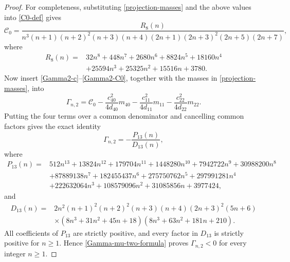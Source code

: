 \documentclass[11pt]{article}
\begin{document}
\begin{proof}
For completeness, substituting \eqref{projection-masses} and the above values into \eqref{C0-def} gives
\begin{equation}\label{Gamma2-C0}
 \mathscr C_0=
 \frac{R_8(n)}
 {n^3(n+1)(n+2)^2(n+3)(n+4)(2n+1)(2n+3)^2(2n+5)(2n+7)},
\end{equation}
where
\begin{align*}
 R_8(n)={}&32n^8+448n^7+2680n^6+8824n^5+18160n^4\\
 &+25594n^3+25325n^2+15516n+3780.
\end{align*}
Now insert \eqref{Gamma2-c}--\eqref{Gamma2-C0}, together with the masses in \eqref{projection-masses}, into
\[
 \Gamma_{n,2}=\mathscr C_0-
 \frac{c_{40}^2}{4d_{40}}m_{40}
 -\frac{c_{11}^2}{4d_{11}}m_{11}
 -\frac{c_{22}^2}{4d_{22}}m_{22}.
\]
Putting the four terms over a common denominator and cancelling common factors gives the exact identity
\begin{equation}\label{Gamma-mu-two-formula}
 \Gamma_{n,2}=-\frac{P_{13}(n)}{D_{13}(n)},
\end{equation}
where
\begin{align*}
P_{13}(n)={}&512n^{13}+13824n^{12}+179704n^{11}+1448280n^{10}
 +7942722n^9+30988200n^8\\
&+87889138n^7+182455437n^6+275750762n^5+297991281n^4\\
&+222632064n^3+108579096n^2+31085856n+3977424,
\end{align*}
and
\begin{align*}
D_{13}(n)={}&2n^2(n+1)^2(n+2)^2(n+3)(n+4)(2n+3)^2(5n+6)\\
&\times(8n^3+31n^2+45n+18)(8n^3+63n^2+181n+210).
\end{align*}
All coefficients of $P_{13}$ are strictly positive, and every factor in $D_{13}$ is strictly positive for $n\ge1$. Hence \eqref{Gamma-mu-two-formula} proves $\Gamma_{n,2}<0$ for every integer $n\ge1$.
\end{proof}
\endgroup
\end{document}
